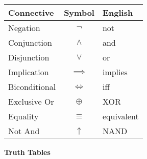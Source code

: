 \documentclass{article}
\numberwithin{theorem}{subsection}
\numberwithin{theorem}{subsubsection}
\numberwithin{lemma}{subsection}
\numberwithin{lemma}{subsubsection}
\theoremstyle{definition}
\numberwithin{definition}{subsection}
\numberwithin{definition}{subsubsection}
\begin{document}
\begin{table}[H]
  \begin{center}
    \begin{tabular}{l|c|l} %
      \textbf{Connective} & \textbf{Symbol} & \textbf{English}\\
      \hline
      Negation & $\neg$ & not\\
      Conjunction & $\wedge$ & and\\
      Disjunction & $\vee$ & or\\
      Implication & $\implies$ & implies\\
      Biconditional & $\iff$ & iff\\
      Exclusive Or & $\oplus$ & XOR\\
      Equality & $\equiv$ & equivalent\\
      Not And & $\uparrow$ & NAND\\
    \end{tabular}
  \end{center}
\end{table}

\begin{flushleft}
\textbf{Truth Tables}
\end{flushleft}
\end{document}
